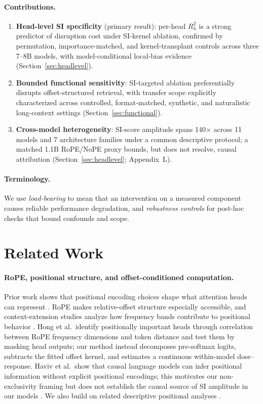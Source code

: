 \documentclass{article}
\begin{document}
\paragraph{Contributions.}
\begin{enumerate}
\item \textbf{Head-level SI specificity} (primary result): per-head $R_h^2$ is a strong predictor of disruption cost under SI-kernel ablation, confirmed by permutation, importance-matched, and kernel-transplant controls across three 7--8B models, with model-conditional local-bias evidence (Section~\ref{sec:headlevel}).
\item \textbf{Bounded functional sensitivity}: SI-targeted ablation preferentially disrupts offset-structured retrieval, with transfer scope explicitly characterized across controlled, format-matched, synthetic, and naturalistic long-context settings (Section~\ref{sec:functional}).
\item \textbf{Cross-model heterogeneity}: SI-score amplitude spans 140$\times$ across 11 models and 7 architecture families under a common descriptive protocol; a matched 1.1B RoPE/NoPE proxy bounds, but does not resolve, causal attribution (Section~\ref{sec:headlevel}; Appendix~L).
\end{enumerate}

\paragraph{Terminology.}
We use \textit{load-bearing} to mean that an intervention on a measured component causes reliable performance degradation, and \textit{robustness controls} for post-hoc checks that bound confounds and scope.


\section{Related Work}

\paragraph{RoPE, positional structure, and offset-conditioned computation.}
Prior work shows that positional encoding choices shape what attention heads can represent \citep{vaswani2017attention,shaw2018self,press2022train,su2021roformer}. RoPE makes relative-offset structure especially accessible, and context-extension studies analyze how frequency bands contribute to positional behavior \citep{chen2023extending,peng2023yarn,hong2024tokendistance}. Hong et al.\ identify positionally important heads through correlation between RoPE frequency dimensions and token distance and test them by masking head outputs; our method instead decomposes pre-softmax logits, subtracts the fitted offset kernel, and estimates a continuous within-model dose--response. Haviv et al.\ show that causal language models can infer positional information without explicit positional encodings; this motivates our non-exclusivity framing but does not establish the causal source of SI amplitude in our models \citep{haviv2022transformer}. We also build on related descriptive positional analyses \citep{barbero2024round}.
\end{document}
